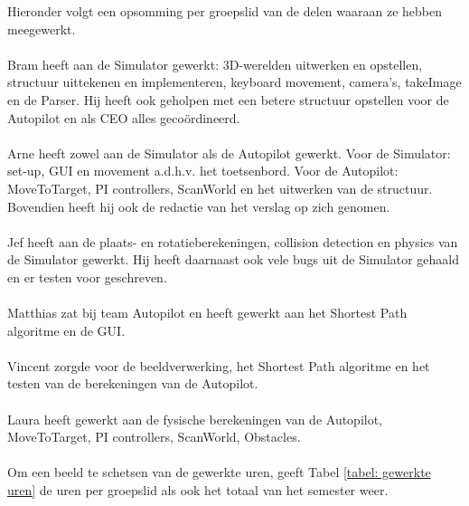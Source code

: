 \documentclass[]{penoverslag}
\begin{document}
Hieronder volgt een opsomming per groepslid van de delen waaraan ze hebben meegewerkt.
\\
\\
Bram heeft aan de Simulator gewerkt: 3D-werelden uitwerken en opstellen, structuur uittekenen en implementeren, keyboard movement, camera's, takeImage en de Parser. Hij heeft ook geholpen met een betere structuur opstellen voor de Autopilot en als CEO alles geco\"ordineerd.
\\
\\
Arne heeft zowel aan de Simulator als de Autopilot gewerkt. Voor de Simulator: set-up, GUI en movement a.d.h.v. het toetsenbord. Voor de Autopilot: MoveToTarget, PI controllers, ScanWorld en het uitwerken van de structuur. Bovendien heeft hij ook de redactie van het verslag op zich genomen.
\\
\\
Jef heeft aan de plaats- en rotatieberekeningen, collision detection en physics van de Simulator gewerkt. Hij heeft daarnaast ook vele bugs uit de Simulator gehaald en er testen voor geschreven.
\\
\\
Matthias zat bij team Autopilot en heeft gewerkt aan het Shortest Path algoritme en de GUI.
\\
\\
Vincent zorgde voor de beeldverwerking, het Shortest Path algoritme en het testen van de berekeningen van de Autopilot.
\\
\\
Laura heeft gewerkt aan de fysische berekeningen van de Autopilot, MoveToTarget, PI controllers, ScanWorld, Obstacles.
\\
\\
Om een beeld te schetsen van de gewerkte uren, geeft Tabel \ref{tabel: gewerkte uren} de uren per groepslid als ook het totaal van het semester weer.
\\
\\
\end{document}
